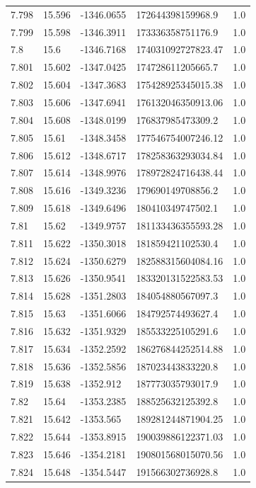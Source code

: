 \begin{tabular}{lllll}
7.798 & 15.596 & -1346.0655 & 172644398159968.9 & 1.0 \\
7.799 & 15.598 & -1346.3911 & 173336358751176.9 & 1.0 \\
7.8 & 15.6 & -1346.7168 & 174031092727823.47 & 1.0 \\
7.801 & 15.602 & -1347.0425 & 174728611205665.7 & 1.0 \\
7.802 & 15.604 & -1347.3683 & 175428925345015.38 & 1.0 \\
7.803 & 15.606 & -1347.6941 & 176132046350913.06 & 1.0 \\
7.804 & 15.608 & -1348.0199 & 176837985473309.2 & 1.0 \\
7.805 & 15.61 & -1348.3458 & 177546754007246.12 & 1.0 \\
7.806 & 15.612 & -1348.6717 & 178258363293034.84 & 1.0 \\
7.807 & 15.614 & -1348.9976 & 178972824716438.44 & 1.0 \\
7.808 & 15.616 & -1349.3236 & 179690149708856.2 & 1.0 \\
7.809 & 15.618 & -1349.6496 & 180410349747502.1 & 1.0 \\
7.81 & 15.62 & -1349.9757 & 181133436355593.28 & 1.0 \\
7.811 & 15.622 & -1350.3018 & 181859421102530.4 & 1.0 \\
7.812 & 15.624 & -1350.6279 & 182588315604084.16 & 1.0 \\
7.813 & 15.626 & -1350.9541 & 183320131522583.53 & 1.0 \\
7.814 & 15.628 & -1351.2803 & 184054880567097.3 & 1.0 \\
7.815 & 15.63 & -1351.6066 & 184792574493627.4 & 1.0 \\
7.816 & 15.632 & -1351.9329 & 185533225105291.6 & 1.0 \\
7.817 & 15.634 & -1352.2592 & 186276844252514.88 & 1.0 \\
7.818 & 15.636 & -1352.5856 & 187023443833220.8 & 1.0 \\
7.819 & 15.638 & -1352.912 & 187773035793017.9 & 1.0 \\
7.82 & 15.64 & -1353.2385 & 188525632125392.8 & 1.0 \\
7.821 & 15.642 & -1353.565 & 189281244871904.25 & 1.0 \\
7.822 & 15.644 & -1353.8915 & 190039886122371.03 & 1.0 \\
7.823 & 15.646 & -1354.2181 & 190801568015070.56 & 1.0 \\
7.824 & 15.648 & -1354.5447 & 191566302736928.8 & 1.0 \\

\end{tabular}
